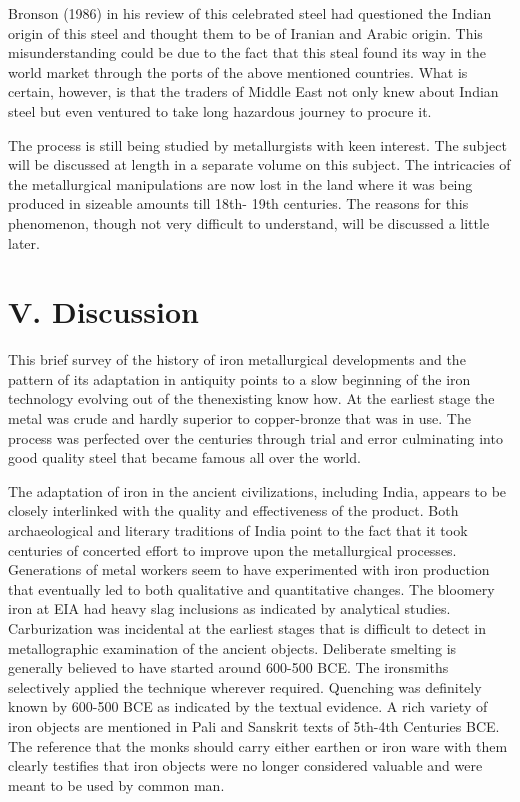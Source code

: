 Bronson (1986) in his review of this celebrated steel had questioned the Indian origin of this steel and thought them to be of Iranian and Arabic origin. This misunderstanding could be due to the fact that this steal found its way in the world market through the ports of the above mentioned countries. What is certain, however, is that the traders of Middle East not only knew about Indian steel but even ventured to take long hazardous journey to procure it.

The process is still being studied by metallurgists with keen interest. The subject will be discussed at length in a separate volume on this subject. The intricacies of the metallurgical manipulations are now lost in the land where it was being produced in sizeable amounts till 18th- 19th centuries. The reasons for this phenomenon, though not very difficult to understand, will be discussed a little later.


\section*{V. Discussion}

This brief survey of the history of iron metallurgical developments and the pattern of its adaptation in antiquity points to a slow beginning of the iron technology evolving out of the thenexisting know how. At the earliest stage the metal was crude and hardly superior to copper-bronze that was in use. The process was perfected over the centuries through trial and error culminating into good quality steel that became famous all over the world.

The adaptation of iron in the ancient civilizations, including India, appears to be closely interlinked with the quality and effectiveness of the product. Both archaeological and literary traditions of India point to the fact that it took centuries of concerted effort to improve upon the metallurgical processes. Generations of metal workers seem to have experimented with iron production that eventually led to both qualitative and quantitative changes. The bloomery iron at EIA had heavy slag inclusions as indicated by analytical studies. Carburization was incidental at the earliest stages that is difficult to detect in metallographic examination of the ancient objects. Deliberate smelting is generally believed to have started around 600-500 BCE. The ironsmiths selectively applied the technique wherever required. Quenching was definitely known by 600-500 BCE as indicated by the textual evidence. A rich variety of iron objects are mentioned in Pali and Sanskrit texts of 5th-4th Centuries BCE. The reference that the monks should carry either earthen or iron ware with them clearly testifies that iron objects were no longer considered valuable and were meant to be used by common man.

